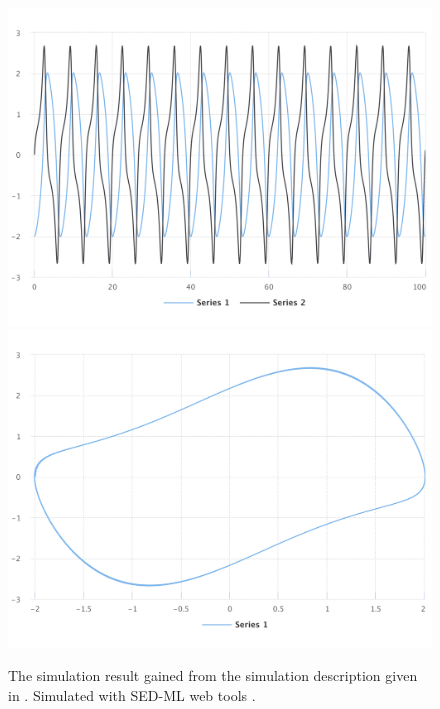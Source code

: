 \begin{figure}[ht]
    \centering
    \begin{minipage}{0.47\textwidth}
        \centering
        \includegraphics[width=1.0\textwidth]{examples/vanderpol-cellml/results/sedml_webtools/plot1}
        \includegraphics[width=1.0\textwidth]{examples/vanderpol-cellml/results/sedml_webtools/plot2}
        \caption{The simulation result gained from the simulation description given in . Simulated with SED-ML web tools \citep{bergmann2017sed}.}
    \end{minipage}\hfill
    \begin{minipage}{0.47\textwidth}
        \centering

\end{minipage}
\end{figure}
